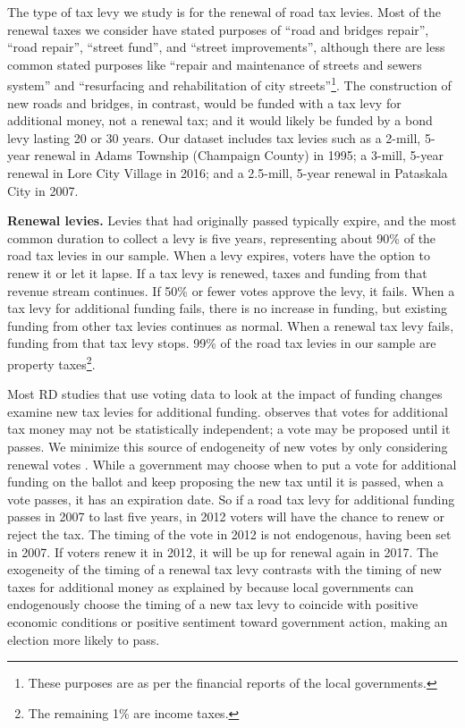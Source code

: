 
The type of tax levy we study is for the renewal of road tax levies. Most of the renewal taxes we consider have stated purposes of ``road and bridges repair'', ``road repair'', ``street fund'', and ``street improvements'', although there are less common stated purposes like ``repair and maintenance of streets and sewers system'' and ``resurfacing and rehabilitation of city streets''\footnote{These purposes are as per the financial reports of the local governments.}.  The construction of new roads and bridges, in contrast, would be funded with a tax levy for additional money, not a renewal tax; and it would likely be funded by a bond levy lasting 20 or 30 years.  
Our dataset includes tax levies such as a 2-mill, 5-year renewal in Adams Township (Champaign County) in 1995; a 3-mill, 5-year renewal in Lore City Village in 2016; and a 2.5-mill, 5-year renewal in Pataskala City in 2007.

{\bf Renewal levies.} Levies that had originally passed typically expire, and the most common duration to collect a levy is five years, representing about 90\% of the road tax levies in our sample. When a levy expires, voters have the option to renew it or let it lapse. If a tax levy is renewed, taxes and funding from that revenue stream continues. If 50\% or fewer votes approve the levy, it fails.  When a tax levy for additional funding fails, there is no increase in funding, but existing funding from other tax levies continues as normal.  When a renewal tax levy fails, funding from that tax levy stops. 99\% of the road tax levies in our sample are property taxes\footnote{The remaining 1\% are income taxes.}.

Most RD studies that use voting data to look at the impact of funding changes examine new tax levies for additional funding.  \cite{cellini2010value} observes that votes for additional tax money may not be statistically independent; a vote may be proposed until it passes.  We minimize this source of endogeneity of new votes by only considering renewal votes \citep{brasington2017school}.  While a government may choose when to put a vote for additional funding on the ballot and keep proposing the new tax until it is passed, when a vote passes, it has an expiration date.  So if a road tax levy for additional funding passes in 2007 to last five years, in 2012 voters will have the chance to renew or reject the tax.  The timing of the vote in 2012 is not endogenous, having been set in 2007.  If voters renew it in 2012, it will be up for renewal again in 2017. The exogeneity of the timing of a renewal tax levy contrasts with the timing of new taxes for additional money as explained by \cite{cellini2010value} because local governments can endogenously choose the timing of a new tax levy to coincide with positive economic conditions or positive sentiment toward government action, making an election more likely to pass.

